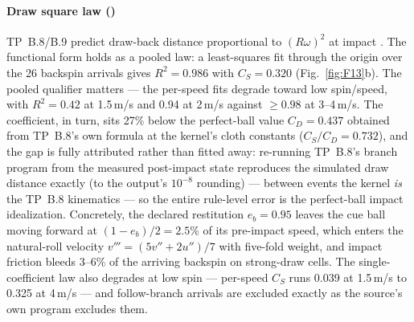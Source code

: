 \paragraph{Draw square law ()}
TP~B.8/B.9 predict draw-back distance proportional to $(R\omega)^2$ at
impact \citep{alciatore_tp_catalog}. The functional form holds as a
pooled law: a least-squares fit through the origin over the 26 backspin
arrivals gives $R^2 = 0.986$ with $C_S = 0.320$ (Fig.~\ref{fig:F13}b).
The pooled qualifier matters --- the per-speed fits degrade toward low
spin/speed, with $R^2 = 0.42$ at 1.5\,m/s and 0.94 at 2\,m/s against
${\geq}0.98$ at 3--4\,m/s. The coefficient, in turn, sits 27\%
below the perfect-ball value $C_D = 0.437$ obtained from TP~B.8's own
formula at the kernel's cloth constants ($C_S/C_D = 0.732$), and the gap
is fully attributed rather than fitted away: re-running TP~B.8's branch
program from the measured post-impact state reproduces the simulated draw
distance exactly (to the output's $10^{-8}$ rounding) --- between events
the kernel \emph{is} the TP~B.8 kinematics --- so the entire rule-level
error is the perfect-ball impact idealization. Concretely, the declared
restitution $e_b = 0.95$ leaves the cue ball moving forward at
$(1-e_b)/2 = 2.5\%$ of its pre-impact speed, which enters the natural-roll
velocity $v''' = (5v'' + 2u'')/7$ with five-fold weight, and impact
friction bleeds 3--6\% of the arriving backspin on strong-draw cells. The single-coefficient law also
degrades at low spin --- per-speed $C_S$ runs 0.039 at 1.5\,m/s to 0.325
at 4\,m/s --- and follow-branch arrivals are excluded exactly as the
source's own program excludes them.

